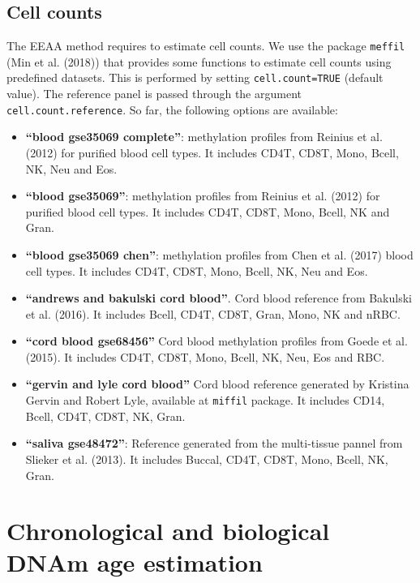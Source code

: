 \documentclass[]{article}
\providecommand{\tightlist}{%
  \setlength{\itemsep}{0pt}\setlength{\parskip}{0pt}}
\begin{document}
\hypertarget{cell-counts}{%
\subsection{Cell counts}\label{cell-counts}}

The EEAA method requires to estimate cell counts. We use the package \texttt{meffil} (Min et al. (2018)) that provides some functions to estimate cell counts using predefined datasets. This is performed by setting \texttt{cell.count=TRUE} (default value). The reference panel is passed through the argument \texttt{cell.count.reference}. So far, the following options are available:

\begin{itemize}
\tightlist
\item
  \textbf{``blood gse35069 complete''}: methylation profiles from Reinius et al. (2012) for purified blood cell types. It includes CD4T, CD8T, Mono, Bcell, NK, Neu and Eos.
\item
  \textbf{``blood gse35069''}: methylation profiles from Reinius et al. (2012) for purified blood cell types. It includes CD4T, CD8T, Mono, Bcell, NK and Gran.
\item
  \textbf{``blood gse35069 chen''}: methylation profiles from Chen et al. (2017) blood cell types. It includes CD4T, CD8T, Mono, Bcell, NK, Neu and Eos.
\item
  \textbf{``andrews and bakulski cord blood''}. Cord blood reference from Bakulski et al. (2016). It includes Bcell, CD4T, CD8T, Gran, Mono, NK and nRBC.
\item
  \textbf{``cord blood gse68456''} Cord blood methylation profiles from Goede et al. (2015). It includes CD4T, CD8T, Mono, Bcell, NK, Neu, Eos and RBC.
\item
  \textbf{``gervin and lyle cord blood''} Cord blood reference generated by Kristina Gervin and Robert Lyle, available at \texttt{miffil} package. It includes CD14, Bcell, CD4T, CD8T, NK, Gran.
\item
  \textbf{``saliva gse48472''}: Reference generated from the multi-tissue pannel from Slieker et al. (2013). It includes Buccal, CD4T, CD8T, Mono, Bcell, NK, Gran.
\end{itemize}

\hypertarget{chronological-and-biological-dnam-age-estimation}{%
\section{Chronological and biological DNAm age estimation}\label{chronological-and-biological-dnam-age-estimation}}
\end{document}
